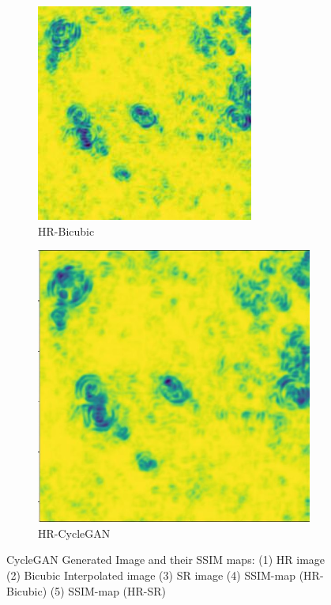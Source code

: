 \begin{figure}[H]
  \begin{subfigure}[b]{0.275\textwidth}
    \includegraphics[width=\textwidth]{Chapter7/SSIM_bicubic_9.jpg}
    \caption{HR-Bicubic}
  \end{subfigure}
  \begin{subfigure}[b]{0.275\textwidth}
    \includegraphics[width=\textwidth]{Chapter5/SSIM_cyclegan_9.jpg}
    \caption{HR-CycleGAN}
  \end{subfigure}
    \caption[CycleGAN Generated Image and their SSIM maps]{CycleGAN Generated Image and their SSIM maps: (1) HR image (2) Bicubic Interpolated image (3) SR image (4) SSIM-map (HR-Bicubic) (5) SSIM-map (HR-SR) \cite{CycleGAN} \cite{SSIM}}
    \label{fig:label5.6}
\end{figure}
